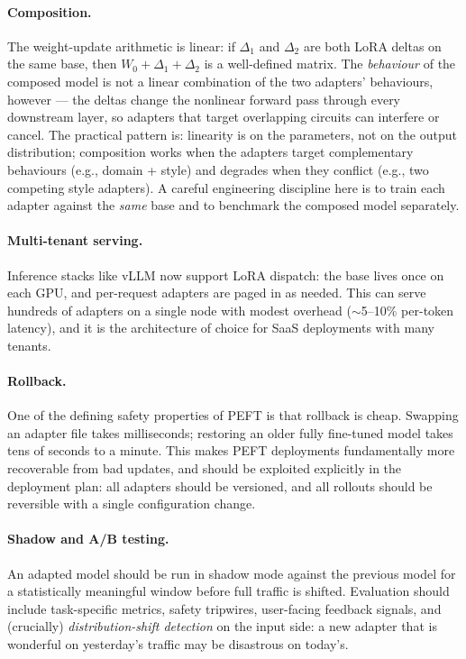 \paragraph{Composition.} The weight-update arithmetic is linear:
if $\Delta_1$ and $\Delta_2$ are both LoRA deltas on the same base,
then $W_0 + \Delta_1 + \Delta_2$ is a well-defined matrix. The
\emph{behaviour} of the composed model is not a linear combination
of the two adapters' behaviours, however --- the deltas change the
nonlinear forward pass through every downstream layer, so adapters
that target overlapping circuits can interfere or cancel. The
practical pattern is: linearity is on the parameters, not on the
output distribution; composition works when the adapters target
complementary behaviours (e.g., domain + style) and degrades when
they conflict (e.g., two competing style adapters). A careful
engineering discipline here is to train each adapter against the
\emph{same} base and to benchmark the composed model separately.

\paragraph{Multi-tenant serving.} Inference stacks like vLLM
\citep{kwon2023vllm} now support LoRA dispatch: the base lives once
on each GPU, and per-request adapters are paged in as needed. This
can serve hundreds of adapters on a single node with modest overhead
($\sim$5--10\% per-token latency), and it is the architecture of
choice for SaaS deployments with many tenants.

\paragraph{Rollback.} One of the defining safety properties of PEFT
is that rollback is cheap. Swapping an adapter file takes
milliseconds; restoring an older fully fine-tuned model takes tens
of seconds to a minute. This makes PEFT deployments fundamentally
more recoverable from bad updates, and should be exploited
explicitly in the deployment plan: all adapters should be versioned,
and all rollouts should be reversible with a single configuration
change.

\paragraph{Shadow and A/B testing.} An adapted model should be run
in shadow mode against the previous model for a statistically
meaningful window before full traffic is shifted. Evaluation should
include task-specific metrics, safety tripwires, user-facing
feedback signals, and (crucially) \emph{distribution-shift
detection} on the input side: a new adapter that is wonderful on
yesterday's traffic may be disastrous on today's.

